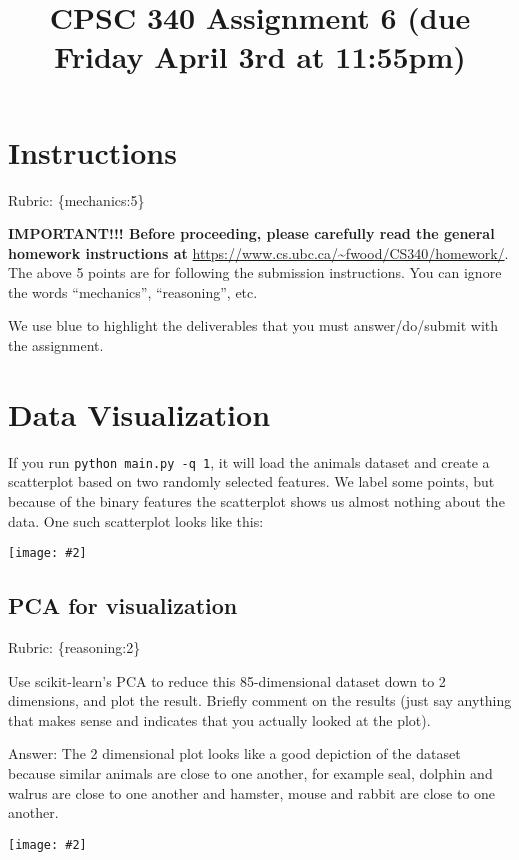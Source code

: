 \documentclass{article}
\def\rubric#1{\gre{Rubric: \{#1\}}}{}
\def\blu#1{{\color{blu}#1}}
\def\gre#1{{\color{gre}#1}}
\def\ans#1{\gre{Answer: #1}}{}
\newcommand{\centerfig}[2]{\begin{center}\texttt{[image: \#2]}\end{center}}
\begin{document}
\title{CPSC 340 Assignment 6 (due Friday April 3rd at 11:55pm)}
\date{}
\maketitle

\vspace{-7em}


\section*{Instructions}
\rubric{mechanics:5}

\textbf{IMPORTANT!!! Before proceeding, please carefully read the general homework instructions at} \url{https://www.cs.ubc.ca/~fwood/CS340/homework/}. The above 5 points are for following the submission instructions. You can ignore the words ``mechanics'', ``reasoning'', etc.

\vspace{1em}
We use \blu{blue} to highlight the deliverables that you must answer/do/submit with the assignment.

\section{Data Visualization}

If you run \verb|python main.py -q 1|, it will load the animals dataset and create a scatterplot based on two randomly selected features.
We label some points, but because of the binary features the scatterplot shows us almost nothing about the data. One such scatterplot looks like this:

\centerfig{.5}{../figs/two_random_features.png}

\subsection{PCA for visualization}
\rubric{reasoning:2}

Use scikit-learn's PCA to reduce this 85-dimensional dataset down to 2 dimensions, and plot the result. Briefly comment on the results (just say anything that makes sense and indicates that you actually looked at the plot).

\ans{The 2 dimensional plot looks like a good depiction of the dataset because similar animals are close to one another, for example seal, dolphin and walrus are close to one another and hamster, mouse and rabbit are close to one another.}

\centerfig{.5}{../figs/pca_2_components.png}
\end{document}
